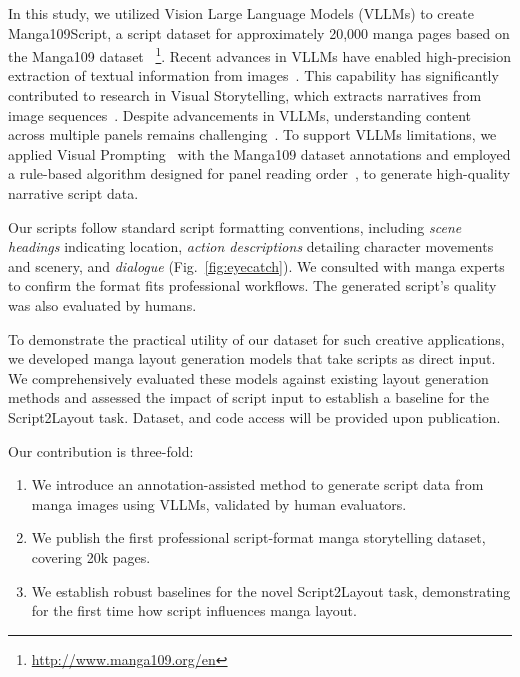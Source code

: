 In this study, we utilized Vision Large Language Models (VLLMs) to create Manga109Script, a script dataset for approximately 20,000 manga pages based on the Manga109 dataset ~\cite{matsui2017sketch,aizawa_building_2020}\footnote{\url{http://www.manga109.org/en}}.
Recent advances in VLLMs have enabled high-precision extraction of textual information from images~\cite{zhang_vision-language_2024}. This capability has significantly contributed to research in Visual Storytelling, which extracts narratives from image sequences~\cite{oliveira_story_2024, li_benchmark_2025}.
Despite advancements in VLLMs, understanding content across multiple panels remains challenging~\cite{ikuta_mangaub_2024,vivoli_comicap_2024}.
To support VLLMs limitations, we applied Visual Prompting~\cite{shtedritski_what_2023} with the Manga109 dataset annotations and employed a rule-based algorithm designed for panel reading order~\cite{sachdeva_manga_2024}, to generate high-quality narrative script data.

Our scripts follow standard script formatting conventions, including {\it scene headings} indicating location, {\it action descriptions} detailing character movements and scenery, and {\it dialogue} (Fig.~\ref{fig:eyecatch}).
We consulted with manga experts to confirm the format fits professional workflows.
The generated script's quality was also evaluated by humans.

To demonstrate the practical utility of our dataset for such creative applications, we developed manga layout generation models that take scripts as direct input.
We comprehensively evaluated these models against existing layout generation methods and assessed the impact of script input to establish a baseline for the Script2Layout task. Dataset, and code access will be provided upon publication.

Our contribution is three-fold:
\begin{enumerate}
    \item We introduce an annotation-assisted method to generate script data from manga images using VLLMs, validated by human evaluators.
    \item We publish the first professional script-format manga storytelling dataset, covering 20k pages.
    \item We establish robust baselines for the novel Script2Layout task, demonstrating for the first time how script influences manga layout.
\end{enumerate}

